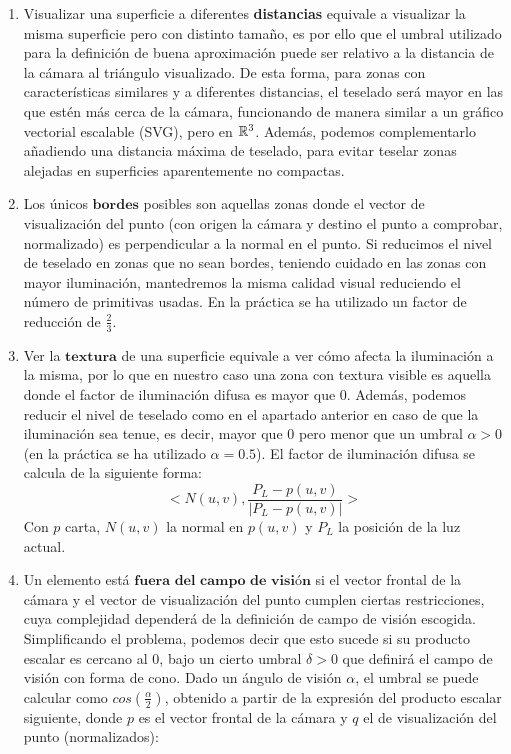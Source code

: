 	\begin{enumerate}
		\item Visualizar una superficie a diferentes \textbf{distancias} equivale a visualizar la misma superficie pero con distinto tamaño, es por ello que el umbral utilizado para la definición de buena aproximación puede ser relativo a la distancia de la cámara al triángulo visualizado. De esta forma, para zonas con características similares y a diferentes distancias, el teselado será mayor en las que estén más cerca de la cámara, funcionando de manera similar a un gráfico vectorial escalable (SVG), pero en $\mathbb{R}^3$. Además, podemos complementarlo añadiendo una distancia máxima de teselado, para evitar teselar zonas alejadas en superficies aparentemente no compactas.
		\item Los únicos $\textbf{bordes}$ posibles son aquellas zonas donde el vector de visualización del punto (con origen la cámara y destino el punto a comprobar, normalizado) es perpendicular a la normal en el punto. Si reducimos el nivel de teselado en zonas que no sean bordes, teniendo cuidado en las zonas con mayor iluminación, mantedremos la misma calidad visual reduciendo el número de primitivas usadas. En la práctica se ha utilizado un factor de reducción de $\frac{2}{3}$.
		\item Ver la $\textbf{textura}$ de una superficie equivale a ver cómo afecta la iluminación a la misma, por lo que en nuestro caso una zona con textura visible es aquella donde el factor de iluminación difusa es mayor que $0$. Además, podemos reducir el nivel de teselado como en el apartado anterior en caso de que la iluminación sea tenue, es decir, mayor que $0$ pero menor que un umbral $\alpha>0$ (en la práctica se ha utilizado $\alpha = 0.5$). El factor de iluminación difusa se calcula de la siguiente forma:
		$$<N(u,v),\frac{P_L-p(u,v)}{|P_L-p(u,v)|}>$$
		Con $p$ carta, $N(u,v)$ la normal en $p(u,v)$ y $P_L$ la posición de la luz actual.
		\item Un elemento está $\textbf{fuera del campo de visión}$ si el vector frontal de la cámara y el vector de visualización del punto cumplen ciertas restricciones, cuya complejidad dependerá de la definición de campo de visión escogida. Simplificando el problema, podemos decir que esto sucede si su producto escalar es cercano al $0$, bajo un cierto umbral $\delta>0$ que definirá el campo de visión con forma de cono. Dado un ángulo de visión $\alpha$, el umbral se puede calcular como $cos(\frac{\alpha}{2})$, obtenido a partir de la expresión del producto escalar siguiente, donde $p$ es el vector frontal de la cámara y $q$ el de visualización del punto (normalizados):

\end{enumerate}
